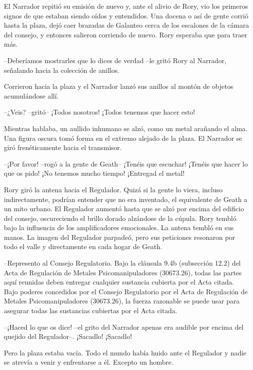 {El Narrador repitió su emisión de nuevo y, ante el alivio de Rory, vio
	los primeros signos de que estaban siendo oídos y entendidos. Una docena
	o así de gente corrió hasta la plaza, dejó caer brazadas de Galanteo
	cerca de los escalones de la cámara del consejo, y entonces salieron
corriendo de nuevo. Rory esperaba que para traer más.}

{--Deberíamos mostrarles que lo dices de verdad --le gritó Rory al
Narrador, señalando hacia la colección de anillos.}

{Corrieron hacia la plaza y el Narrador lanzó sus anillos al montón de
objetos acumulándose allí.}

{--¿Veis? --gritó-- ¡Todos nosotros! ¡Todos tenemos que hacer esto!}

{Mientras hablaba, un aullido inhumano se alzó, como un metal arañando
	el alma. Una figura oscura tomó forma en el extremo alejado de la plaza.
El Narrador se giró frenéticamente hacia el transmisor.}

{--¡Por favor! --rogó a la gente de Geath-- ¡Tenéis que escuchar!
	¡Tenéis que hacer lo que os pido! ¡No tenemos mucho tiempo! ¡Entregad el
metal!}

{Rory giró la antena hacia el Regulador. Quizá si la gente lo viera,
	incluso indirectamente, podrían entender que no era inventado, el
	equivalente de Geath a un mito urbano. El Regulador aumentó hasta que se
	alzó por encima del edificio del consejo, oscureciendo el brillo dorado
	alzándose de la cúpula. Rory tembló bajo la influencia de los
	amplificadores emocionales. La antena tembló en sus manos. La imagen del
	Regulador parpadeó, pero sus peticiones resonaron por todo el valle y
directamente en cada hogar de Geath.}

{--Represento al Consejo Regulatorio. Bajo la cláusula 9.4b
	(subsección 12.2) del Acta de Regulación de Metales Psicomanipuladores
	(30673.26), todas las partes aquí reunidas deben entregar cualquier
	sustancia cubierta por el Acta citada. Bajo poderes concedidos por el
	Consejo Regulatorio por el Acta de Regulación de Metales
	Psicomanipuladores (30673.26), la fuerza razonable se puede usar para
asegurar todas las sustancias cubiertas por el Acta citada.}

{--¡Haced lo que os dice! --el grito del Narrador apenas era audible
por encima del quejido del Regulador--. ¡Sacadlo! ¡Sacadlo!}

{Pero la plaza estaba vacía. Todo el mundo había huido ante el Regulador
y nadie se atrevía a venir y enfrentarse a él. Excepto un hombre.}

